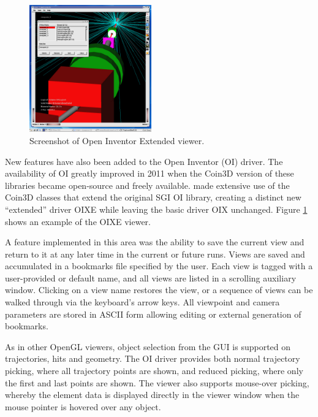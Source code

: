 \begin{figure}
\includegraphics[width=0.47\textwidth]{figures/visfig2.pdf}
  \caption{Screenshot of Open Inventor Extended viewer.}
  \label{fig:vis2}
\end{figure}

New features have also been added to the Open Inventor (OI) driver.  The 
availability of OI greatly improved in 2011 when the Coin3D \cite{vis:coin3d} 
version of these libraries became open-source and freely available.  \Gfour{} 
made extensive use of the Coin3D classes that extend the original SGI OI 
library, creating a distinct new ``extended'' driver OIXE while leaving the 
basic driver OIX unchanged.  Figure \ref{fig:vis2} shows an example of the OIXE
viewer. 

A feature implemented in this area was the ability to save the current view and
return to it at any later time in the current or future runs.  Views are saved 
and accumulated in a bookmarks file specified by the user.  Each view is tagged
with a user-provided or default name, and all views are listed in a scrolling 
auxiliary window.  Clicking on a view name restores the view, or a sequence of 
views can be walked through via the keyboard's arrow keys.  All viewpoint and 
camera parameters are stored in ASCII form allowing editing or external 
generation of bookmarks.

As in other OpenGL viewers, object selection from the GUI is supported on 
trajectories, hits and geometry.  The OI driver provides both normal trajectory 
picking, where all trajectory points are shown, and reduced picking, where only
the first and last points are shown.  The viewer also supports mouse-over 
picking, whereby the element data is displayed directly in the viewer window 
when the mouse pointer is hovered over any object.

